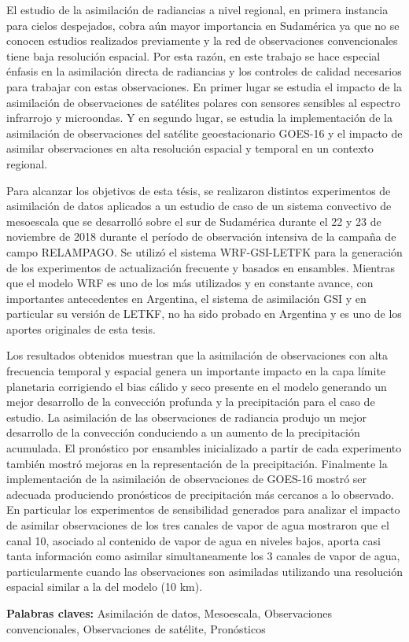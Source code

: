 \documentclass[12pt,oneside,a4paper]{reedthesis}
\begin{document}
\begin{resumen}
    El estudio de la asimilación de radiancias a nivel regional, en primera instancia para cielos despejados, cobra aún mayor importancia en Sudamérica ya que no se conocen estudios realizados previamente y la red de observaciones convencionales tiene baja resolución espacial. Por esta razón, en este trabajo se hace especial énfasis en la asimilación directa de radiancias y los controles de calidad necesarios para trabajar con estas observaciones. En primer lugar se estudia el impacto de la asimilación de observaciones de satélites polares con sensores sensibles al espectro infrarrojo y microondas. Y en segundo lugar, se estudia la implementación de la asimilación de observaciones del satélite geoestacionario GOES-16 y el impacto de asimilar observaciones en alta resolución espacial y temporal en un contexto regional.
    
    Para alcanzar los objetivos de esta tésis, se realizaron distintos experimentos de asimilación de datos aplicados a un estudio de caso de un sistema convectivo de mesoescala que se desarrolló sobre el sur de Sudamérica durante el 22 y 23 de noviembre de 2018 durante el período de observación intensiva de la campaña de campo RELAMPAGO. Se utilizó el sistema WRF-GSI-LETFK para la generación de los experimentos de actualización frecuente y basados en ensambles. Mientras que el modelo WRF es uno de los más utilizados y en constante avance, con importantes antecedentes en Argentina, el sistema de asimilación GSI y en particular su versión de LETKF, no ha sido probado en Argentina y es uno de los aportes originales de esta tesis.
    
    Los resultados obtenidos muestran que la asimilación de observaciones con alta frecuencia temporal y espacial genera un importante impacto en la capa límite planetaria corrigiendo el bias cálido y seco presente en el modelo generando un mejor desarrollo de la convección profunda y la precipitación para el caso de estudio. La asimilación de las observaciones de radiancia produjo un mejor desarrollo de la convección conduciendo a un aumento de la precipitación acumulada. El pronóstico por ensambles inicializado a partir de cada experimento también mostró mejoras en la representación de la precipitación. Finalmente la implementación de la asimilación de observaciones de GOES-16 mostró ser adecuada produciendo pronósticos de precipitación más cercanos a lo observado. En particular los experimentos de sensibilidad generados para analizar el impacto de asimilar observaciones de los tres canales de vapor de agua mostraron que el canal 10, asociado al contenido de vapor de agua en niveles bajos, aporta casi tanta información como asimilar simultaneamente los 3 canales de vapor de agua, particularmente cuando las observaciones son asimiladas utilizando una resolución espacial similar a la del modelo (10 km).
    
    \textbf{Palabras claves:} Asimilación de datos, Mesoescala, Observaciones convencionales, Observaciones de satélite, Pronósticos
  \end{resumen}
\end{document}
